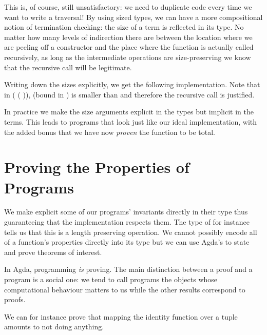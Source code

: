 
This is, of course, still unsatisfactory: we need to duplicate code every
time we want to write a traversal! By using sized types, we can have a more
compositional notion of termination checking: the size of a term is reflected
in its type. No matter how many levels of indirection there are between the
location where we are peeling off a constructor and the place where the function
is actually called recursively, as long as the intermediate operations are
size-preserving we know that the recursive call will be legitimate.

Writing down the sizes explicitly, we get the following implementation. Note
that in ( (  )),
 (bound in ) is smaller than  and therefore the recursive
call is justified.


In practice we make the size arguments explicit in the types but implicit in the
terms. This leads to programs that look just like our ideal implementation, with
the added bonus that we have now \emph{proven} the function to be total.


\section{Proving the Properties of Programs}

We make explicit some of our programs' invariants directly in their
type thus guaranteeing that the implementation respects them. The
type of  for instance tells us that
this is a length preserving operation. We cannot possibly encode all
of a function's properties directly into its type but we can use
Agda's to state and prove theorems of interest.

In Agda, programming \emph{is} proving. The main distinction between
a proof and a program is a social one: we tend to call programs the
objects whose computational behaviour matters to us while the other
results correspond to proofs.

We can for instance prove that mapping the identity function over a
tuple amounts to not doing anything.

